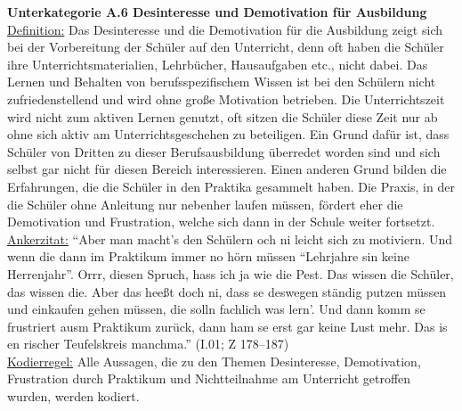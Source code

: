 \noindent
\textbf{Unterkategorie A.6 Desinteresse und Demotivation für Ausbildung}\\
\underline{Definition:} Das Desinteresse und die Demotivation für die Ausbildung zeigt sich bei der Vorbereitung der Schüler auf den Unterricht, denn oft haben die Schüler ihre Unterrichtsmaterialien, Lehrbücher, Hausaufgaben etc., nicht dabei. Das Lernen und Behalten von berufsspezifischem Wissen ist bei den Schülern nicht zufriedenstellend und wird ohne große Motivation betrieben. Die Unterrichtszeit wird nicht zum aktiven Lernen genutzt, oft sitzen die Schüler diese Zeit nur ab ohne sich aktiv am Unterrichtsgeschehen zu beteiligen. Ein Grund dafür ist, dass Schüler von Dritten zu dieser Berufsausbildung überredet worden sind und sich selbst gar nicht für diesen Bereich interessieren. Einen anderen Grund bilden die Erfahrungen, die die Schüler in den Praktika gesammelt haben. Die Praxis, in der die Schüler ohne Anleitung nur nebenher laufen müssen, fördert eher die Demotivation und Frustration, welche sich dann in der Schule weiter fortsetzt.\\
\underline{Ankerzitat:} "`Aber man macht’s den Schülern och ni leicht sich zu motiviern. Und wenn die dann im Praktikum immer no hörn müssen "`Lehrjahre sin keine Herrenjahr"'. Orrr, diesen Spruch, hass ich ja wie die Pest. Das wissen die Schüler, das wissen die. Aber das heeßt doch ni, dass se deswegen ständig putzen müssen und einkaufen gehen müssen, die solln fachlich was lern'. Und dann komm se frustriert ausm Praktikum zurück, dann ham se erst gar keine Lust mehr. Das is en rischer Teufelskreis manchma."' (I.01; Z 178--187)\\
\underline{Kodierregel:} Alle Aussagen, die zu den Themen Desinteresse, Demotivation, Frustration durch Praktikum und Nichtteilnahme am Unterricht getroffen wurden, werden kodiert.\\

